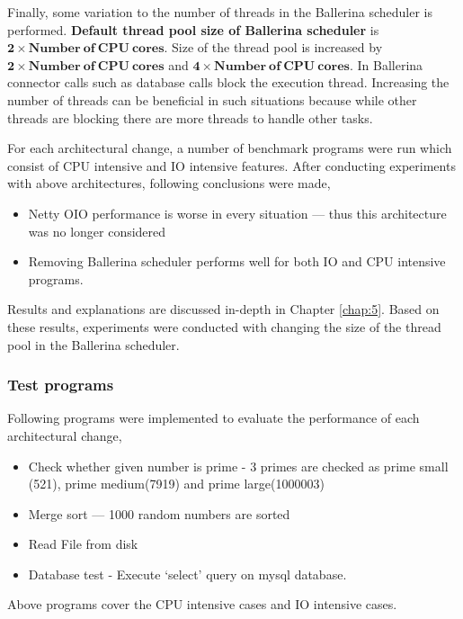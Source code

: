 %

Finally, some variation to the number of threads in the Ballerina scheduler is performed. \textbf{Default thread pool size of Ballerina scheduler} is \textbf{$ \boldsymbol{2} \times \boldsymbol{Number\: of\: CPU\: cores}$}. Size of the thread pool is increased by \textbf{$ \boldsymbol{2} \times \boldsymbol{Number\: of\: CPU\: cores}$} and \textbf{$ \boldsymbol{4} \times \boldsymbol{Number\: of\: CPU\: cores}$}. In Ballerina connector calls such as database calls block the execution thread. Increasing the number of threads can be beneficial in such situations because while other threads are blocking there are more threads to handle other tasks. 

For each architectural change, a number of benchmark programs were run which consist of CPU intensive and IO intensive features.
After conducting experiments with above architectures, following conclusions were made,
 
\begin{itemize}
	\item Netty OIO performance is worse in every situation — thus this architecture was no longer considered
	\item Removing Ballerina scheduler performs well for both IO and CPU intensive programs.
\end{itemize} 

Results and explanations are discussed in-depth in Chapter \ref{chap:5}. Based on these results, experiments were conducted with changing the size of the thread pool in the Ballerina scheduler.

\subsubsection{Test programs}

Following programs were implemented to evaluate the performance of each architectural change,

  \begin{itemize}
  	\item Check whether given number is prime - 3 primes are checked as prime small (521), prime medium(7919) and prime large(1000003)
  	\item Merge sort — 1000 random numbers are sorted
  	\item Read File from disk
  	\item Database test - Execute ‘select’ query on mysql database.
  \end{itemize} 
Above programs cover the CPU intensive cases and IO intensive cases. 

